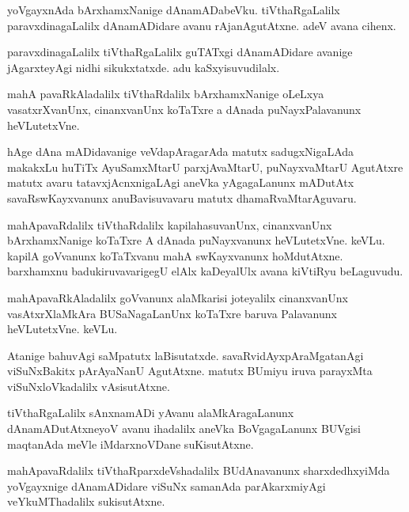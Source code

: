 \documentclass{article}
\begin{document}
\begin{mn}
yoVgayxnAda bArxhamxNanige dAnamADabeVku. tiVthaRgaLalilx paravxdinagaLalilx 
dAnamADidare avanu rAjanAgutAtxne.  adeV avana cihenx.
\end{mn}

\begin{mn}
paravxdinagaLalilx tiVthaRgaLalilx  guTATxgi dAnamADidare avanige jAgarxteyAgi  
nidhi sikukxtatxde.  adu kaSxyisuvudilalx.
\end{mn}

\begin{mn}
mahA pavaRkAladalilx tiVthaRdalilx bArxhamxNanige  oLeLxya vasatxrXvanUnx,  
cinanxvanUnx koTaTxre a dAnada puNayxPalavanunx  heVLutetxVne.
\end{mn}

\begin{mn}
hAge dAna mADidavanige  veVdapAragarAda  matutx sadugxNigaLAda makakxLu  huTiTx 
AyuSamxMtarU  parxjAvaMtarU,  puNayxvaMtarU AgutAtxre  matutx avaru  tatavxjAcnxnigaLAgi 
aneVka yAgagaLanunx mADutAtx savaRswKayxvanunx anuBavisuvavaru  matutx dhamaRvaMtarAguvaru.
\end{mn}

\begin{mn}
mahApavaRdalilx tiVthaRdalilx kapilahasuvanUnx,  cinanxvanUnx bArxhamxNanige koTaTxre 
A dAnada  puNayxvanunx heVLutetxVne.  keVLu.  kapilA goVvanunx koTaTxvanu mahA 
swKayxvanunx hoMdutAtxne.  barxhamxnu badukiruvavarigegU  elAlx kaDeyalUlx avana kiVtiRyu beLaguvudu.
\end{mn}

\begin{mn}
mahApavaRkAladalilx goVvanunx alaMkarisi joteyalilx cinanxvanUnx vasAtxrXlaMkAra 
BUSaNagaLanUnx koTaTxre baruva  Palavanunx heVLutetxVne. keVLu.
\end{mn}

\begin{mn}
Atanige bahuvAgi saMpatutx laBisutatxde.  savaRvidAyxpAraMgatanAgi viSuNxBakitx 
pArAyaNanU AgutAtxne.  matutx BUmiyu iruva parayxMta viSuNxloVkadalilx vAsisutAtxne.
\end{mn}

\begin{mn}
tiVthaRgaLalilx sAnxnamADi yAvanu alaMkAragaLanunx dAnamADutAtxneyoV avanu 
ihadalilx aneVka BoVgagaLanunx BUVgisi  maqtanAda meVle iMdarxnoVDane suKisutAtxne.
\end{mn}

\begin{mn}
mahApavaRdalilx  tiVthaRparxdeVshadalilx   BUdAnavanunx sharxdedhxyiMda yoVgayxnige 
dAnamADidare viSuNx samanAda parAkarxmiyAgi veYkuMThadalilx sukisutAtxne.
\end{mn}
\end{document}
